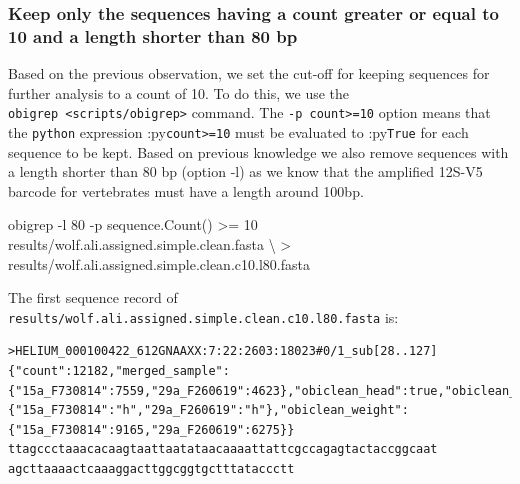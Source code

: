 \documentclass[
  letterpaper,
  DIV=11,
  numbers=noendperiod]{scrreprt}
\newenvironment{Shaded}{\begin{snugshade}}{\end{snugshade}}
\newcommand{\AttributeTok}[1]{\textcolor[rgb]{0.40,0.45,0.13}{#1}}
\newcommand{\DataTypeTok}[1]{\textcolor[rgb]{0.68,0.00,0.00}{#1}}
\newcommand{\ExtensionTok}[1]{\textcolor[rgb]{0.00,0.23,0.31}{#1}}
\newcommand{\NormalTok}[1]{\textcolor[rgb]{0.00,0.23,0.31}{#1}}
\newcommand{\OperatorTok}[1]{\textcolor[rgb]{0.37,0.37,0.37}{#1}}
\newcommand{\StringTok}[1]{\textcolor[rgb]{0.13,0.47,0.30}{#1}}
\begin{document}
\hypertarget{keep-only-the-sequences-having-a-count-greater-or-equal-to-10-and-a-length-shorter-than-80-bp}{%
\subsubsection*{Keep only the sequences having a count greater or equal
to 10 and a length shorter than 80
bp}\label{keep-only-the-sequences-having-a-count-greater-or-equal-to-10-and-a-length-shorter-than-80-bp}}

Based on the previous observation, we set the cut-off for keeping
sequences for further analysis to a count of 10. To do this, we use the
\texttt{obigrep\ \textless{}scripts/obigrep\textgreater{}} command. The
\texttt{-p\ \textquotesingle{}count\textgreater{}=10\textquotesingle{}}
option means that the \texttt{python} expression
:py\texttt{count\textgreater{}=10} must be evaluated to :py\texttt{True}
for each sequence to be kept. Based on previous knowledge we also remove
sequences with a length shorter than 80 bp (option -l) as we know that
the amplified 12S-V5 barcode for vertebrates must have a length around
100bp.

\begin{Shaded}
\begin{Highlighting}[]
\ExtensionTok{obigrep} \AttributeTok{{-}l}\NormalTok{ 80 }\AttributeTok{{-}p} \StringTok{\textquotesingle{}sequence.Count() \textgreater{}= 10\textquotesingle{}}\NormalTok{ results/wolf.ali.assigned.simple.clean.fasta }\DataTypeTok{\textbackslash{}}
    \OperatorTok{\textgreater{}}\NormalTok{ results/wolf.ali.assigned.simple.clean.c10.l80.fasta}
\end{Highlighting}
\end{Shaded}

The first sequence record of
\texttt{results/wolf.ali.assigned.simple.clean.c10.l80.fasta} is:

\begin{verbatim}
>HELIUM_000100422_612GNAAXX:7:22:2603:18023#0/1_sub[28..127] {"count":12182,"merged_sample":{"15a_F730814":7559,"29a_F260619":4623},"obiclean_head":true,"obiclean_headcount":2,"obiclean_internalcount":0,"obiclean_samplecount":2,"obiclean_singletoncount":0,"obiclean_status":{"15a_F730814":"h","29a_F260619":"h"},"obiclean_weight":{"15a_F730814":9165,"29a_F260619":6275}}
ttagccctaaacacaagtaattaatataacaaaattattcgccagagtactaccggcaat
agcttaaaactcaaaggacttggcggtgctttataccctt
\end{verbatim}
\end{document}
